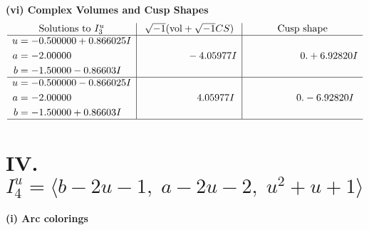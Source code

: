 \documentclass[1p]{elsarticle_modified}
\theoremstyle{definition}
\newcommand{\I}{\sqrt{-1}}
\begin{document}
\newpage\flushleft \textbf{(vi) Complex Volumes and Cusp Shapes}
$$\begin{array}{c|c|c}  
\text{Solutions to }I^u_{3}& \I (\text{vol} + \sqrt{-1}CS) & \text{Cusp shape}\\
 \hline 
\begin{aligned}
u &= -0.500000 + 0.866025 I \\
a &= -2.00000\phantom{ +0.000000I} \\
b &= -1.50000 - 0.86603 I\end{aligned}
 & \phantom{-0.000000 } -4.05977 I & \phantom{-0.000000 -}0. + 6.92820 I \\ \hline\begin{aligned}
u &= -0.500000 - 0.866025 I \\
a &= -2.00000\phantom{ +0.000000I} \\
b &= -1.50000 + 0.86603 I\end{aligned}
 & \phantom{-0.000000 -}4.05977 I & \phantom{-0.000000 } 0. - 6.92820 I\\
 \hline 
 \end{array}$$\newpage\newpage\renewcommand{\arraystretch}{1}
\centering \section*{IV. $I^u_{4}= \langle b-2 u-1,\;a-2 u-2,\;u^2+u+1 \rangle$}
\flushleft \textbf{(i) Arc colorings}\\
\end{document}
